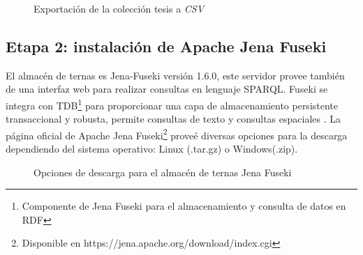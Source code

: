 \begin{figure}[!ht]
	\centering
    \caption{Exportaci\'on de la colecci\'on tesis a \textit{CSV}}
    \label{exportacion-csv}
\end{figure}

\subsection{Etapa 2: instalaci\'on de Apache Jena Fuseki}

El almac\'en de ternas es Jena-Fuseki versi\'on 1.6.0, este servidor provee tambi\'en de una interfaz web para realizar consultas en lenguaje SPARQL. Fuseki se integra con TDB\footnote{Componente de Jena Fuseki para el almacenamiento y consulta de datos en RDF} para proporcionar una capa de almacenamiento persistente transaccional y robusta, permite consultas de texto y consultas espaciales \cite{JenaFuseki}. La p\'agina oficial de Apache Jena Fuseki\footnote{Disponible en https://jena.apache.org/download/index.cgi} prove\'e diversas opciones para la descarga dependiendo del sistema operativo: Linux (.tar.gz) o Windows(.zip). 

\begin{figure}[!ht]
	\centering
    \caption{Opciones de descarga para el almac\'en de ternas Jena Fuseki}
\label{opcionesDescargaFuseki}
\end{figure}

